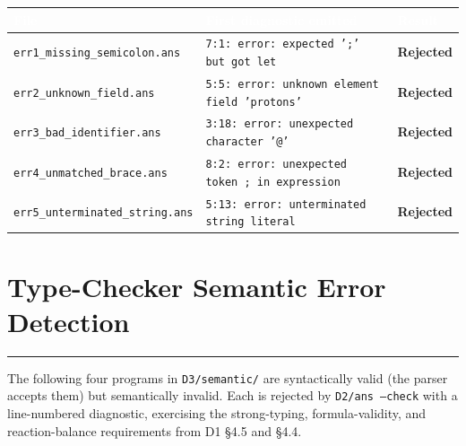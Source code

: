 \documentclass[11pt,a4paper]{article}
\newcommand{\code}[1]{\texttt{#1}}
\newcommand{\file}[1]{{\footnotesize\texttt{#1}}}
\newcommand{\statuserr}{\textcolor{ansdanger}{\textbf{Rejected}}}
\newcommand{\sectionrule}{\vspace{-3pt}\textcolor{ansborder}{\rule{\textwidth}{0.6pt}}\vspace{2pt}}
\begin{document}
\begin{table}[h]
\vspace{2pt}
\centering\small
{}
\begin{tabularx}{\textwidth}{@{} Y Y L{1.5cm} @{}}
\toprule
{}
\textcolor{white}{\textbf{File}} &
\textcolor{white}{\textbf{First diagnostic emitted}} &
\textcolor{white}{\textbf{Result}} \\
\midrule
\file{err1\_missing\_semicolon.ans} &
\code{7:1: error: expected ';' but got let} &
\statuserr \\
\file{err2\_unknown\_field.ans} &
\code{5:5: error: unknown element field 'protons'} &
\statuserr \\
\file{err3\_bad\_identifier.ans} &
\code{3:18: error: unexpected character '@'} &
\statuserr \\
\file{err4\_unmatched\_brace.ans} &
\code{8:2: error: unexpected token ; in expression} &
\statuserr \\
\file{err5\_unterminated\_string.ans} &
\code{5:13: error: unterminated string literal} &
\statuserr \\
\bottomrule
\end{tabularx}
\end{table}

\section{Type-Checker Semantic Error Detection}
\sectionrule

The following four programs in \code{D3/semantic/} are syntactically valid
(the parser accepts them) but semantically invalid. Each is rejected by
\code{D2/ans --check} with a line-numbered diagnostic, exercising the
strong-typing, formula-validity, and reaction-balance requirements from D1 §4.5
and §4.4.
\end{document}
